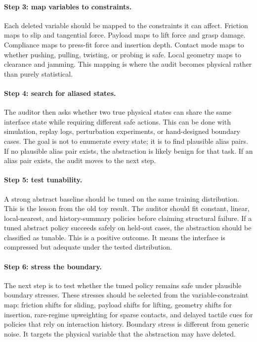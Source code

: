 \documentclass{article}
\begin{document}
\paragraph{Step 3: map variables to constraints.}
Each deleted variable should be mapped to the constraints it can affect. Friction
maps to slip and tangential force. Payload maps to lift force and grasp damage.
Compliance maps to press-fit force and insertion depth. Contact mode maps to
whether pushing, pulling, twisting, or probing is safe. Local geometry maps to
clearance and jamming. This mapping is where the audit becomes physical rather
than purely statistical.

\paragraph{Step 4: search for aliased states.}
The auditor then asks whether two true physical states can share the same
interface state while requiring different safe actions. This can be done with
simulation, replay logs, perturbation experiments, or hand-designed boundary
cases. The goal is not to enumerate every state; it is to find plausible alias
pairs. If no plausible alias pair exists, the abstraction is likely benign for
that task. If an alias pair exists, the audit moves to the next step.

\paragraph{Step 5: test tunability.}
A strong abstract baseline should be tuned on the same training distribution.
This is the lesson from the old toy result. The auditor should fit constant,
linear, local-nearest, and history-summary policies before claiming structural
failure. If a tuned abstract policy succeeds safely on held-out cases, the
abstraction should be classified as tunable. This is a positive outcome. It means
the interface is compressed but adequate under the tested distribution.

\paragraph{Step 6: stress the boundary.}
The next step is to test whether the tuned policy remains safe under plausible
boundary stresses. These stresses should be selected from the variable-constraint
map: friction shifts for sliding, payload shifts for lifting, geometry shifts for
insertion, rare-regime upweighting for sparse contacts, and delayed tactile cues
for policies that rely on interaction history. Boundary stress is different from
generic noise. It targets the physical variable that the abstraction may have
deleted.
\end{document}
